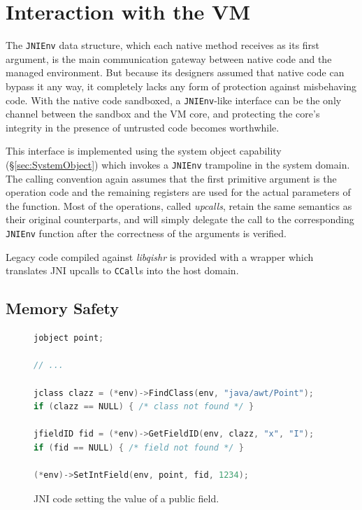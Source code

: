 \documentclass[a4paper,12pt,twoside,openright]{report}
\newcommand{\insn}[1]{\texttt{#1}}
\newcommand{\tool}[1]{\emph{#1}}
\newcommand{\lib}[1]{\tool{lib#1}}
\begin{document}
\section{Interaction with the VM}

The \texttt{JNIEnv} data structure, which each native method receives as its first argument, is the main communication gateway between native code and the managed environment. But because its designers assumed that native code can bypass it any way, it completely lacks any form of protection against misbehaving code. With the native code sandboxed, a \texttt{JNIEnv}-like interface can be the only channel between the sandbox and the VM core, and protecting the core's integrity in the presence of untrusted code becomes worthwhile.

This interface is implemented using the system object capability (\S\ref{sec:SystemObject}) which invokes a \texttt{JNIEnv} trampoline in the system domain. The calling convention again assumes that the first primitive argument is the operation code and the remaining registers are used for the actual parameters of the function. Most of the operations, called \emph{upcalls}, retain the same semantics as their original counterparts, and will simply delegate the call to the corresponding \texttt{JNIEnv} function after the correctness of the arguments is verified. 

Legacy code compiled against \lib{qishr} is provided with a wrapper which translates JNI upcalls to \insn{CCall}s into the host domain.

\subsection{Memory Safety}
\label{sec:MemorySafety}

\begin{figure}[t]
	\begin{lstlisting}[language=C]
jobject point;

// ...

jclass clazz = (*env)->FindClass(env, "java/awt/Point");
if (clazz == NULL) { /* class not found */ }

jfieldID fid = (*env)->GetFieldID(env, clazz, "x", "I");
if (fid == NULL) { /* field not found */ }

(*env)->SetIntField(env, point, fid, 1234);
	\end{lstlisting}
	\caption{JNI code setting the value of a public field.}
	\label{listing:SetFieldValue}
\end{figure}
\end{document}
